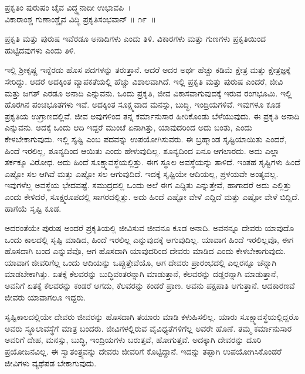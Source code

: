 \begin{shloka}
ಪ್ರಕೃತಿಂ ಪುರುಷಂ ಚೈವ ವಿದ್ಧ್ಯನಾದೀ ಉಭಾವಪಿ~।\\ವಿಕಾರಾಂಶ್ಚ ಗುಣಾಂಶ್ಚೈವ ವಿದ್ಧಿ ಪ್ರಕೃತಿಸಂಭವಾನ್ \hfill॥ ೧೯~॥
\end{shloka}

\begin{artha}
ಪ್ರಕೃತಿ ಮತ್ತು ಪುರುಷ ಇವೆರಡೂ ಅನಾದಿಗಳು ಎಂದು ತಿಳಿ. ವಿಕಾರಗಳು ಮತ್ತು ಗುಣಗಳು ಪ್ರಕೃತಿಯಿಂದ ಹುಟ್ಟಿದವುಗಳು ಎಂದು ತಿಳಿ.
\end{artha}

ಇಲ್ಲಿ ಶ‍್ರೀಕೃಷ್ಣ ಇನ್ನೆರಡು ಹೊಸ ಪದಗಳನ್ನು ತರುತ್ತಾನೆ. ಆದರೆ ಅದರ ಅರ್ಥ ಹೆಚ್ಚು ಕಡಿಮೆ ಕ್ಷೇತ್ರ ಮತ್ತು ಕ್ಷೇತ್ರಜ್ಞಕ್ಕೆ ಸೇರಿದ್ದು. ಆದರೆ ಅದಕ್ಕಿಂತ ವ್ಯಾಪಕತೆಯಲ್ಲಿ ಹೆಚ್ಚು ವಿಶಾಲವಾಗಿದೆ. ಇಲ್ಲಿ ಪ್ರಕೃತಿ ಮತ್ತು ಪುರುಷ ಎಂದರೆ, ಜೀವಿ ಮತ್ತು ಜಗತ್ ಎರಡೂ ಅನಾದಿ ಎನ್ನುವನು. ಒಂದು ಪ್ರಕೃತಿ, ಜೀವ ವಿಕಾಸವಾಗುವುದಕ್ಕೆ ಇರುವ ರಂಗಭೂಮಿ. ಇಲ್ಲಿ ಹೊರಗಿನ ಪಂಚಭೂತಗಳು ಇವೆ. ಅದಕ್ಕಿಂತ ಸೂಕ್ಷ್ಮವಾದ ಮನಸ್ಸು, ಬುದ್ಧಿ, ಇಂದ್ರಿಯಗಳಿವೆ. ಇವುಗಳೂ ಕೂಡ ಪ್ರಕೃತಿಯ ಉಗ್ರಾಣದಲ್ಲಿವೆ. ಜೀವ ಅವುಗಳಿಂದ ತನ್ನ ಕರ್ಮಾನುಸಾರ ಹೀರಿಕೊಂಡು ಬೆಳೆಯುವುದು. ಈ ಪ್ರಕೃತಿ ಅನಾದಿ ಎನ್ನುವನು. ಅದಕ್ಕೆ ಒಂದು ಆದಿ ಇದ್ದರೆ ಮುಂಚೆ ಏನಾಗಿತ್ತು, ಯಾವುದರಿಂದ ಅದು ಬಂತು, ಎಂದು ಕೇಳಬೇಕಾಗುವುದು. ಇಲ್ಲಿ ಸೃಷ್ಟಿ ಎಂಬ ಪದವನ್ನು ಉಪಯೋಗಿಸುವರು. ಈ ಬ್ರಹ್ಮಾಂಡ ಸೃಷ್ಟಿಯಾಯಿತು ಎಂದರೆ, ಹಿಂದೆ ಇರಲಿಲ್ಲ, ಶೂನ್ಯದಿಂದ ಆಯಿತು ಎಂದು ಹೇಳುವುದಿಲ್ಲ. ಶೂನ್ಯದಿಂದ ಏನೂ ಆಗಲಾರದು. ಅದು ಎಲ್ಲಾ ತರ್ಕಕ್ಕೂ ವಿರೋಧ. ಅದು ಹಿಂದೆ ಸೂಕ್ಷ್ಮಾವಸ್ಥೆಯಲ್ಲಿತ್ತು. ಈಗ ಸ್ಥೂಲ ಅವಸ್ಥೆಯನ್ನು ತಾಳಿದೆ. ಇಂತಹ ಸೃಷ್ಟಿಗಳು ಹಿಂದೆ ಎಷ್ಟೋ ಸಲ ಆಗಿವೆ ಮತ್ತು ಎಷ್ಟೋ ಸಲ ಆಗುವುದಿದೆ. ಇದಕ್ಕೆ ಸೃಷ್ಟಿಯೇ ಆದಿಯಲ್ಲ, ಪ್ರಳಯವೇ ಅಂತ್ಯವಲ್ಲ. ಇವುಗಳೆಲ್ಲ ಅವಸ್ಥೆಯ ಭೇದವಷ್ಟೆ. ಸಮುದ್ರದಲ್ಲಿ ಒಂದು ಅಲೆ ಈಗ ಎದ್ದಿತು ಎನ್ನುತ್ತೇವೆ, ಹಾಗಾದರೆ ಅದು ಎಲ್ಲಿತ್ತು ಎಂದು ಕೇಳಿದರೆ, ಸೂಕ್ಷ್ಮರೂಪದಲ್ಲಿ ಸಾಗರದಲ್ಲಿತ್ತು. ಅದು ಹಿಂದೆ ಎಷ್ಟೋ ವೇಳೆ ಎದ್ದಿದೆ ಮತ್ತು ಎಷ್ಟೋ ವೇಳೆ ಬಿದ್ದಿದೆ. ಹಾಗೆಯೆ ಸೃಷ್ಟಿ ಕೂಡ.

ಅದರಂತೆಯೇ ಪುರುಷ ಅಂದರೆ ಪ್ರಕೃತಿಯಲ್ಲಿ ಜೀವಿಸುವ ಜೀವನೂ ಕೂಡ ಅನಾದಿ. ಅವನನ್ನೂ ದೇವರು ಯಾವುದೊ ಒಂದು ಕಾಲದಲ್ಲಿ ಸೃಷ್ಟಿ ಮಾಡಿದ, ಹಿಂದೆ ಇರಲಿಲ್ಲ ಎನ್ನುವುದಕ್ಕೆ ಆಗುವುದಿಲ್ಲ. ಯಾವಾಗ ಹಿಂದೆ ಇರಲಿಲ್ಲವೊ, ಈಗ ಹೊಸದಾಗಿ ಬಂದ ಎನ್ನುವೆವೊ, ಆಗ ಹೊಸದಾಗಿ ಯಾವುದರಿಂದ ದೇವರು ಮಾಡಿದ ಎಂದು ಕೇಳಬೇಕಾಗುವುದು. ಯಾವಾಗ ಜೀವರಿಗೆಲ್ಲ ಒಂದು ಆದಿಯನ್ನು ಒಪ್ಪುತ್ತೇವೆಯೊ, ಆಗ ದೇವರು ಪ್ರಾರಂಭದಲ್ಲಿ ಎಲ್ಲರನ್ನೂ ಚೆನ್ನಾಗಿ ಮಾಡಬೇಕಾಗಿತ್ತು. ಏತಕ್ಕೆ ಕೆಲವರನ್ನು ಬುದ್ಧಿವಂತರನ್ನಾಗಿ ಮಾಡುತ್ತಾನೆ, ಕೆಲವರನ್ನು ದಡ್ಡರನ್ನಾಗಿ ಮಾಡುತ್ತಾನೆ, ಅವನಿಗೆ ಏತಕ್ಕೆ ಕೆಲವರನ್ನು ಕಂಡರೆ ಆಗದು, ಕೆಲವರನ್ನು ಕಂಡರೆ ಪ್ರಾಣ. ಅವನು ಪಕ್ಷಪಾತಿ ಆಗುತ್ತಾನೆ. ಆದಕಾರಣವೆ ಜೀವರು ಯಾವಾಗಲೂ ಇದ್ದರು.

ಸೃಷ್ಟಿಕಾಲದಲ್ಲಿಯೇ ದೇವರು ಜೀವರನ್ನು ಹೊಸದಾಗಿ ತಯಾರು ಮಾಡಿ ಕಳುಹಿಸಲಿಲ್ಲ. ಯಾರು ಸೂಕ್ಷ್ಮಾವಸ್ಥೆಯಲ್ಲಿದ್ದರೊ ಅವರು ಸ್ಥೂಲಾವಸ್ಥೆಗೆ ಮಾತ್ರ ಬಂದರು. ಜೀವಿಗಳಲ್ಲಿರುವ ವೈವಿಧ್ಯತೆಗಳಿಗೆಲ್ಲ ಅವರೇ ಹೊಣೆ. ತಮ್ಮ ಕರ್ಮಾನುಸಾರ ಅವರಿಗೆ ದೇಹ, ಮನಸ್ಸು, ಬುದ್ಧಿ, ಇಂದ್ರಿಯಗಳು ಬರುತ್ತವೆ, ಹೋಗುತ್ತವೆ. ಅದಕ್ಕಾಗಿ ದೇವರನ್ನು ದೂರಿ ಪ್ರಯೋಜನವಿಲ್ಲ. ಈ ಸ್ವಾತಂತ್ರ್ಯವನ್ನು ದೇವರು ಜೀವರಿಗೆ ಕೊಟ್ಟಿದ್ದಾನೆ. ಇದನ್ನು ತಪ್ಪಾಗಿ ಉಪಯೋಗಿಸಿಕೊಂಡರೆ ಜೀವಿಗಳು ವ್ಯಥೆಪಡ ಬೇಕಾಗುವುದು.


